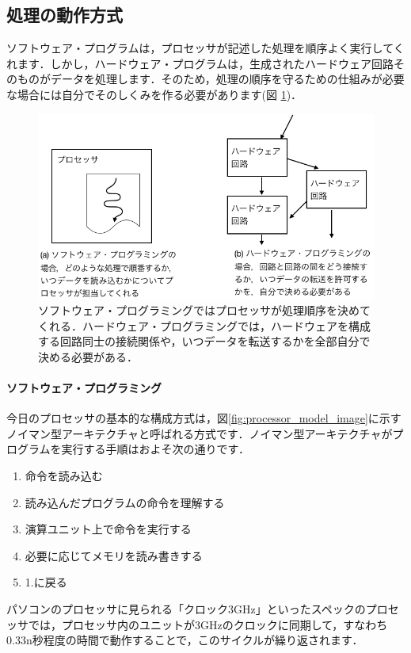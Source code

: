 \documentclass[a4paper,dvipdfmx]{jsarticle}
\begin{document}
\subsection{処理の動作方式}
ソフトウェア・プログラムは，プロセッサが記述した処理を順序よく実行してくれます．しかし，ハードウェア・プログラムは，生成されたハードウェア回路そのものがデータを処理します．そのため，処理の順序を守るための仕組みが必要な場合には自分でそのしくみを作る必要があります(図 \ref{fig:software_vs_hardware})．

 \begin{figure}[H]
  \begin{center}
   \includegraphics[width=.8\textwidth]{chapter01_figures/software_vs_hardware.png}
  \end{center}
  \caption{ソフトウェア・プログラミングではプロセッサが処理順序を決めてくれる．ハードウェア・プログラミングでは，ハードウェアを構成する回路同士の接続関係や，いつデータを転送するかを全部自分で決める必要がある．\label{fig:software_vs_hardware}}
 \end{figure}

\paragraph{ソフトウェア・プログラミング}

今日のプロセッサの基本的な構成方式は，図\ref{fig:processor_model_image}に示すノイマン型アーキテクチャと呼ばれる方式です．ノイマン型アーキテクチャがプログラムを実行する手順はおよそ次の通りです．
\begin{enumerate}
 \item 命令を読み込む
 \item 読み込んだプログラムの命令を理解する
 \item 演算ユニット上で命令を実行する
 \item 必要に応じてメモリを読み書きする
 \item 1.に戻る
\end{enumerate}
パソコンのプロセッサに見られる「クロック3GHz」といったスペックのプロセッサでは，プロセッサ内のユニットが3GHzのクロックに同期して，すなわち0.33n秒程度の時間で動作することで，このサイクルが繰り返されます．
\end{document}
